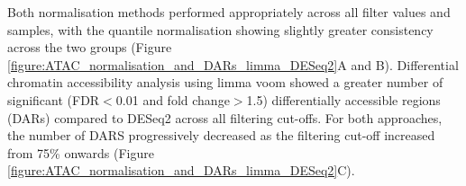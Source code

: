 

Both normalisation methods performed appropriately across all filter values and samples, with the quantile normalisation showing slightly greater consistency across the two groups (Figure \ref{figure:ATAC_normalisation_and_DARs_limma_DESeq2}A and B). Differential chromatin accessibility analysis using limma voom showed a greater number of significant (FDR$<$0.01 and fold change$>$1.5) differentially accessible regions (DARs) compared to DESeq2 across all filtering cut-offs. For both approaches, the number of DARS progressively decreased as the filtering cut-off increased from 75\% onwards (Figure \ref{figure:ATAC_normalisation_and_DARs_limma_DESeq2}C).





